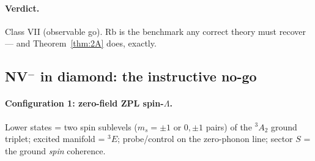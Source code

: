 \documentclass[11pt,a4paper]{article}
\theoremstyle{remark}
\begin{document}
\paragraph{Verdict.} Class VII (observable go). Rb is the benchmark any
correct theory must recover --- and Theorem~\ref{thm:2A} does, exactly.

\subsection{NV$^-$ in diamond: the instructive no-go}

\paragraph{Configuration 1: zero-field ZPL spin-$\Lambda$.}
Lower states = two spin sublevels ($m_s=\pm1$ or $0,\pm1$ pairs) of the
$^3A_2$ ground triplet; excited manifold = $^3E$; probe/control on the
zero-phonon line; sector $S$ = the ground \emph{spin} coherence.
\end{document}
